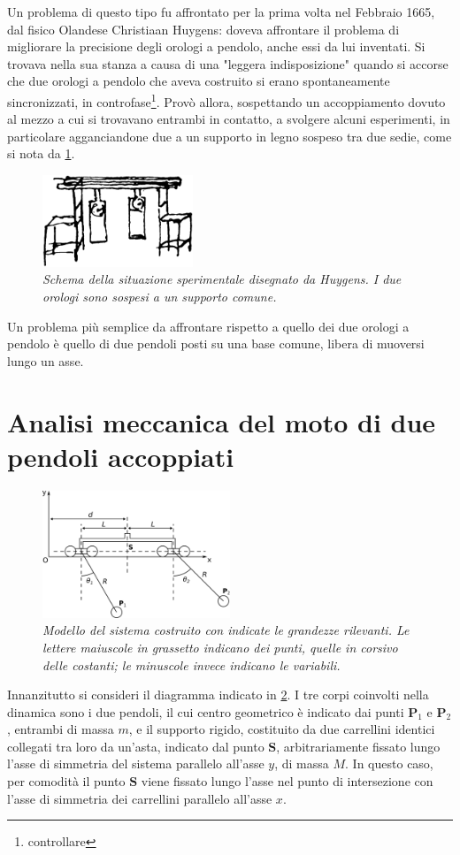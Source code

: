 \documentclass[11pt, a4paper, twoside, italian]{article}
\begin{document}
Un problema di questo tipo fu affrontato per la prima volta nel Febbraio 1665, dal fisico Olandese Christiaan Huygens: doveva affrontare il problema di migliorare la precisione degli orologi a pendolo, anche essi da lui inventati. Si trovava nella sua stanza a causa di una "leggera indisposizione" quando si accorse che due orologi a pendolo che aveva costruito si erano spontaneamente sincronizzati, in controfase\footnote{controllare}. Provò allora, sospettando un accoppiamento dovuto al mezzo a cui si trovavano entrambi in contatto, a svolgere alcuni esperimenti, in particolare agganciandone due a un supporto in legno sospeso tra due sedie, come si nota da \cref{pendoli_huygens}.
\begin{figure}
    \centering
    \includegraphics[width=0.4\textwidth]{../../media/img/pendolums.png}
    \caption{\textit{Schema della situazione sperimentale disegnato da Huygens. I due orologi sono sospesi a un supporto comune.}}
    \label{pendoli_huygens}
\end{figure}
Un problema più semplice da affrontare rispetto a quello dei due orologi a pendolo è quello di due pendoli posti su una base comune, libera di muoversi lungo un asse.
\section{Analisi meccanica del moto di due pendoli accoppiati}
\begin{figure}[h]
    \centering
    \includegraphics[width=0.5\textwidth]{../../media/cad/sketch_2.pdf}
    \caption{\textit{Modello del sistema costruito con indicate
     le grandezze rilevanti. Le lettere maiuscole in grassetto indicano dei punti, quelle in corsivo delle 
     costanti; le minuscole invece indicano le variabili.} }
    \label{pendolicorpolibero}
\end{figure}
Innanzitutto si consideri il diagramma indicato in \cref{pendolicorpolibero}.
I tre corpi coinvolti nella dinamica sono i due pendoli, il cui centro 
geometrico è indicato dai punti $\mathbf{P}_1$ e $\mathbf{P}_2$, entrambi di massa $m$,
e il supporto rigido, costituito da due carrellini identici collegati tra loro da un'asta,
indicato dal punto $\mathbf{S}$, arbitrariamente fissato lungo l'asse di simmetria del sistema 
parallelo all'asse $y$, di massa $M$. In questo caso, per comodità il punto $\mathbf{S}$ 
viene fissato lungo l'asse nel punto di intersezione con l'asse di simmetria dei carrellini
parallelo all'asse $x$.
\end{document}
